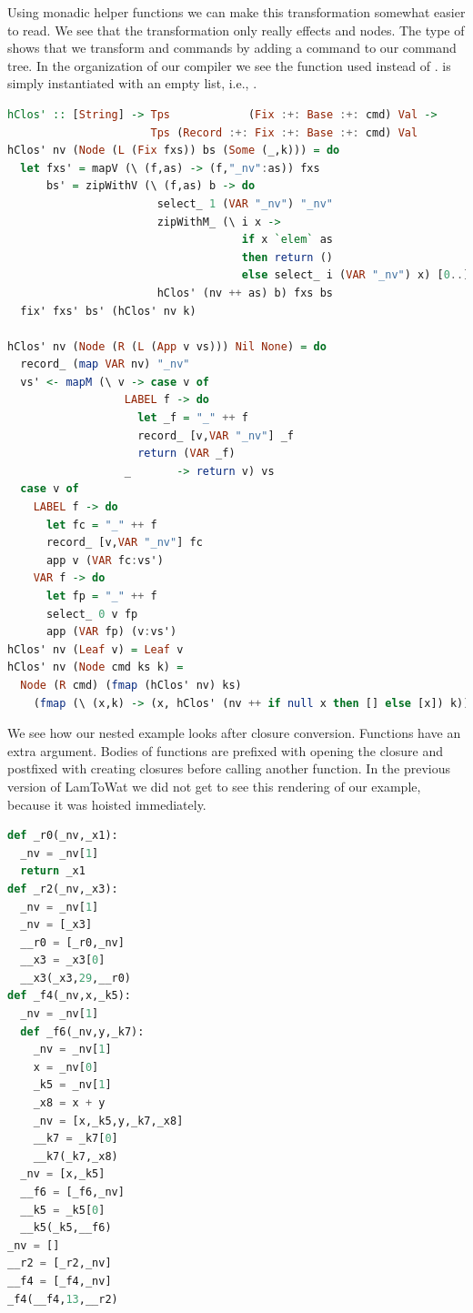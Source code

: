 Using monadic helper functions we can make this transformation somewhat easier to read. We see that the transformation only really effects  and  nodes. The type of  shows that we transform  and  commands by adding a  command to our command tree. In the organization of our compiler we see the function  used instead of .  is simply  instantiated with an empty list, i.e., .

\begin{lstlisting}[language=Haskell]
hClos' :: [String] -> Tps            (Fix :+: Base :+: cmd) Val -> 
                      Tps (Record :+: Fix :+: Base :+: cmd) Val
hClos' nv (Node (L (Fix fxs)) bs (Some (_,k))) = do
  let fxs' = mapV (\ (f,as) -> (f,"_nv":as)) fxs
      bs' = zipWithV (\ (f,as) b -> do
                       select_ 1 (VAR "_nv") "_nv"
                       zipWithM_ (\ i x ->
                                    if x `elem` as
                                    then return ()
                                    else select_ i (VAR "_nv") x) [0..] nv
                       hClos' (nv ++ as) b) fxs bs
  fix' fxs' bs' (hClos' nv k)

hClos' nv (Node (R (L (App v vs))) Nil None) = do
  record_ (map VAR nv) "_nv"
  vs' <- mapM (\ v -> case v of
                  LABEL f -> do
                    let _f = "_" ++ f
                    record_ [v,VAR "_nv"] _f
                    return (VAR _f)
                  _       -> return v) vs
  case v of
    LABEL f -> do
      let fc = "_" ++ f
      record_ [v,VAR "_nv"] fc
      app v (VAR fc:vs')
    VAR f -> do
      let fp = "_" ++ f
      select_ 0 v fp
      app (VAR fp) (v:vs')
hClos' nv (Leaf v) = Leaf v
hClos' nv (Node cmd ks k) =
  Node (R cmd) (fmap (hClos' nv) ks)
    (fmap (\ (x,k) -> (x, hClos' (nv ++ if null x then [] else [x]) k)) k)
\end{lstlisting}

We see how our nested example  looks after closure conversion. Functions have an extra  argument. Bodies of functions are prefixed with opening the closure and postfixed with creating closures before calling another function. In the previous version of LamToWat we did not get to see this rendering of our example, because it was hoisted immediately.

\begin{lstlisting}[language=Python]
def _r0(_nv,_x1):
  _nv = _nv[1]
  return _x1
def _r2(_nv,_x3):
  _nv = _nv[1]
  _nv = [_x3]
  __r0 = [_r0,_nv]
  __x3 = _x3[0]
  __x3(_x3,29,__r0)
def _f4(_nv,x,_k5):
  _nv = _nv[1]
  def _f6(_nv,y,_k7):
    _nv = _nv[1]
    x = _nv[0]
    _k5 = _nv[1]
    _x8 = x + y
    _nv = [x,_k5,y,_k7,_x8]
    __k7 = _k7[0]
    __k7(_k7,_x8)
  _nv = [x,_k5]
  __f6 = [_f6,_nv]
  __k5 = _k5[0]
  __k5(_k5,__f6)
_nv = []
__r2 = [_r2,_nv]
__f4 = [_f4,_nv]
_f4(__f4,13,__r2)
\end{lstlisting}

